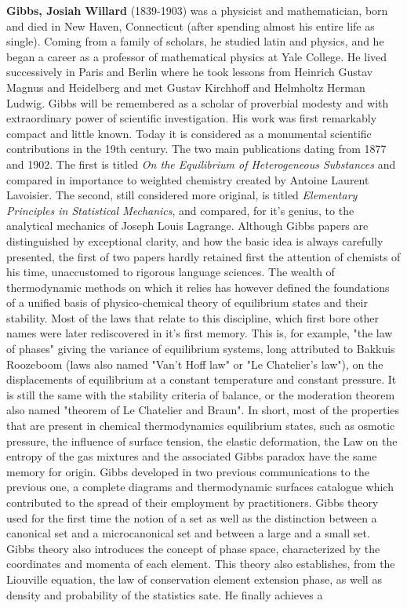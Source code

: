 \textbf{Gibbs, Josiah Willard} (1839-1903) was a physicist and mathematician, born and died in New Haven, Connecticut (after spending almost his entire life as single). Coming from a family of scholars, he studied latin and physics, and he began a career as a professor of mathematical physics at Yale College. He lived successively in Paris and Berlin where he took lessons from Heinrich Gustav Magnus and Heidelberg and met Gustav Kirchhoff and Helmholtz Herman Ludwig. Gibbs will be remembered as a scholar of proverbial modesty and with extraordinary power of scientific investigation. His work was first remarkably compact and little known. Today it is considered as a monumental scientific contributions in the 19th century. The two main publications dating from 1877 and 1902. The first is titled \textit{On the Equilibrium of Heterogeneous Substances} and compared in importance to weighted chemistry created by Antoine Laurent Lavoisier. The second, still considered more original, is titled \textit{Elementary Principles in Statistical Mechanics}, and compared, for it's genius, to the analytical mechanics of Joseph Louis Lagrange. Although Gibbs papers are distinguished by exceptional clarity, and how the basic idea is always carefully presented, the first of two papers hardly retained first the attention of chemists of his time, unaccustomed to rigorous language sciences. The wealth of thermodynamic methods on which it relies has however defined the foundations of a unified basis of physico-chemical theory of equilibrium states and their stability. Most of the laws that relate to this discipline, which first bore other names were later rediscovered in it's first memory. This is, for example, "the law of phases" giving the variance of equilibrium systems, long attributed to Bakkuis Roozeboom (laws also named "Van't Hoff law" or "Le Chatelier's law"), on the displacements of equilibrium at a constant temperature and constant pressure. It is still the same with the stability criteria of balance, or the moderation theorem also named "theorem of Le Chatelier and Braun". In short, most of the properties that are present in chemical thermodynamics equilibrium states, such as osmotic pressure, the influence of surface tension, the elastic deformation, the Law on the entropy of the gas mixtures and the associated Gibbs paradox have the same memory for origin. Gibbs developed in two previous communications to the previous one, a complete diagrams and thermodynamic surfaces catalogue which contributed to the spread of their employment by practitioners. Gibbs theory used for the first time the notion of a set as well as the distinction between a canonical set and a microcanonical set and between a large and a small set. Gibbs theory also introduces the concept of phase space, characterized by the coordinates and momenta of each element. This theory also establishes, from the Liouville equation, the law of conservation element extension phase, as well as density and probability of the statistics sate. He finally achieves a 